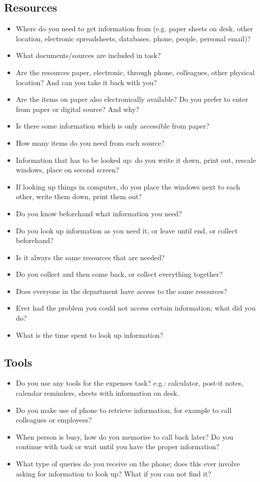 \subsection{Resources}
\begin{itemize}
\item Where do you need to get information from (e.g. paper sheets on desk, other location, electronic spreadsheets, databases, phone, people, personal email)?
\item What documents/sources are included in task?
\item Are the resources paper, electronic, through phone, colleagues, other physical location? And can you take it back with you?
\item Are the items on paper also electronically available? Do you prefer to enter from paper or digital source? And why?
\item Is there some information which is only accessible from paper?
\item How many items do you need from each source?
\item Information that has to be looked up: do you write it down, print out, rescale windows, place on second screen?
\item If looking up things in computer, do you place the windows next to each other, write them down, print them out?
\item Do you know beforehand what information you need?
\item Do you look up information as you need it, or leave until end, or collect beforehand?
\item Is it always the same resources that are needed?
\item Do you collect and then come back, or collect everything together?
\item Does everyone in the department have access to the same resources?
\item Ever had the problem you could not access certain information; what did you do?
\item What is the time spent to look up information?
\end{itemize}

\subsection{Tools}
\begin{itemize}
\item Do you use any tools for the expenses task? e.g.: calculator, post-it notes, calendar reminders, sheets with information on desk.
\item Do you make use of phone to retrieve information, for example to call colleagues or employees?
\item When person is busy, how do you memorise to call back later? Do you continue with task or wait until you have the proper information?
\item What type of queries do you receive on the phone; does this ever involve asking for information to look up? What if you can not find it?
\end{itemize}

